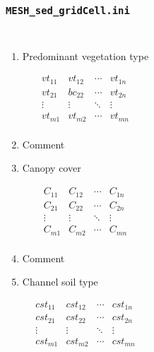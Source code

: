 \documentclass{beamer}
\newcounter{ResumeEnumerate}
\begin{document}
\begin{frame}\frametitle{\texttt{MESH\_sed\_gridCell.ini}}
\begin{columns}
{\tiny
\begin{enumerate}[start=\numexpr\value{ResumeEnumerate}+1, label=Line \arabic*]\itemsep0em 
\item Predominant vegetation type\\[-2.7em]
\begin{minipage}[t]{0.1\linewidth}
\begin{flushright}
$$
\begin{matrix} 
vt_{11} & vt_{12} & \cdots & vt_{1n} \\
vt_{21} & bc_{22} & \cdots & vt_{2n} \\
\vdots & \vdots & \ddots & \vdots \\
vt_{m1} & vt_{m2} & \cdots & vt_{mn}\\
\end{matrix}
$$
\end{flushright}
\end{minipage}
\item Comment
\item Canopy cover\\[-2.7em]
\begin{minipage}[t]{0.1\linewidth}
\begin{flushright}
$$
\begin{matrix} 
C_{11} & C_{12} & \cdots & C_{1n} \\
C_{21} & C_{22} & \cdots & C_{2n} \\
\vdots & \vdots & \ddots & \vdots \\
C_{m1} & C_{m2} & \cdots & C_{mn}\\
\end{matrix}
$$
\end{flushright}
\end{minipage}
\item Comment
\item Channel soil type\\[-2.7em]
\begin{minipage}[t]{0.1\linewidth}
\begin{flushright}
$$
\begin{matrix} 
cst_{11} & cst_{12} & \cdots & cst_{1n} \\
cst_{21} & cst_{22} & \cdots & cst_{2n} \\
\vdots & \vdots & \ddots & \vdots \\
cst_{m1} & cst_{m2} & \cdots & cst_{mn}\\

\end{matrix}$$
\end{flushright}
\end{minipage}
\end{enumerate}}
\end{columns}
\end{frame}
\end{document}
